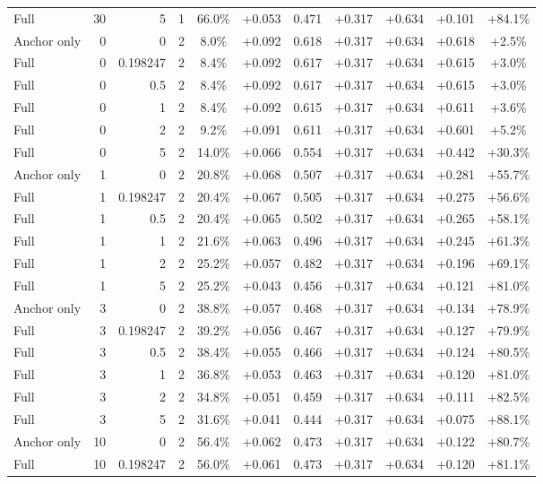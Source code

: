 \begin{table}[htbp]
\begin{tabular}{lrrrccccccc}
Full & 30 & 5 & 1 & 66.0\% & +0.053 & 0.471 & +0.317 & +0.634 & +0.101 & +84.1\% \\
Anchor only & 0 & 0 & 2 & 8.0\% & +0.092 & 0.618 & +0.317 & +0.634 & +0.618 & +2.5\% \\
Full & 0 & 0.198247 & 2 & 8.4\% & +0.092 & 0.617 & +0.317 & +0.634 & +0.615 & +3.0\% \\
Full & 0 & 0.5 & 2 & 8.4\% & +0.092 & 0.617 & +0.317 & +0.634 & +0.615 & +3.0\% \\
Full & 0 & 1 & 2 & 8.4\% & +0.092 & 0.615 & +0.317 & +0.634 & +0.611 & +3.6\% \\
Full & 0 & 2 & 2 & 9.2\% & +0.091 & 0.611 & +0.317 & +0.634 & +0.601 & +5.2\% \\
Full & 0 & 5 & 2 & 14.0\% & +0.066 & 0.554 & +0.317 & +0.634 & +0.442 & +30.3\% \\
Anchor only & 1 & 0 & 2 & 20.8\% & +0.068 & 0.507 & +0.317 & +0.634 & +0.281 & +55.7\% \\
Full & 1 & 0.198247 & 2 & 20.4\% & +0.067 & 0.505 & +0.317 & +0.634 & +0.275 & +56.6\% \\
Full & 1 & 0.5 & 2 & 20.4\% & +0.065 & 0.502 & +0.317 & +0.634 & +0.265 & +58.1\% \\
Full & 1 & 1 & 2 & 21.6\% & +0.063 & 0.496 & +0.317 & +0.634 & +0.245 & +61.3\% \\
Full & 1 & 2 & 2 & 25.2\% & +0.057 & 0.482 & +0.317 & +0.634 & +0.196 & +69.1\% \\
Full & 1 & 5 & 2 & 25.2\% & +0.043 & 0.456 & +0.317 & +0.634 & +0.121 & +81.0\% \\
Anchor only & 3 & 0 & 2 & 38.8\% & +0.057 & 0.468 & +0.317 & +0.634 & +0.134 & +78.9\% \\
Full & 3 & 0.198247 & 2 & 39.2\% & +0.056 & 0.467 & +0.317 & +0.634 & +0.127 & +79.9\% \\
Full & 3 & 0.5 & 2 & 38.4\% & +0.055 & 0.466 & +0.317 & +0.634 & +0.124 & +80.5\% \\
Full & 3 & 1 & 2 & 36.8\% & +0.053 & 0.463 & +0.317 & +0.634 & +0.120 & +81.0\% \\
Full & 3 & 2 & 2 & 34.8\% & +0.051 & 0.459 & +0.317 & +0.634 & +0.111 & +82.5\% \\
Full & 3 & 5 & 2 & 31.6\% & +0.041 & 0.444 & +0.317 & +0.634 & +0.075 & +88.1\% \\
Anchor only & 10 & 0 & 2 & 56.4\% & +0.062 & 0.473 & +0.317 & +0.634 & +0.122 & +80.7\% \\
Full & 10 & 0.198247 & 2 & 56.0\% & +0.061 & 0.473 & +0.317 & +0.634 & +0.120 & +81.1\% \\

\end{tabular}
\end{table}
